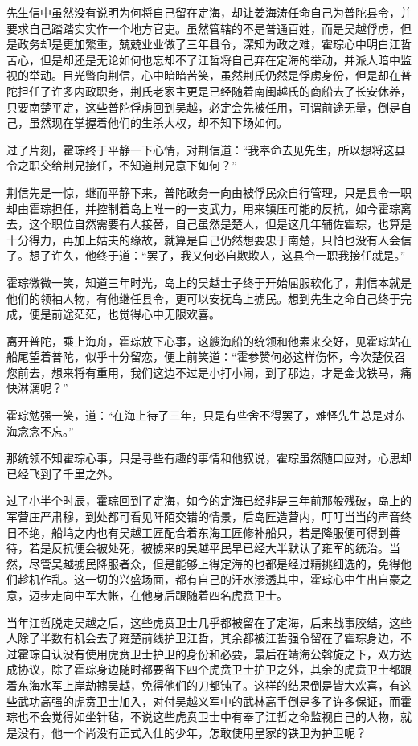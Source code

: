 先生信中虽然没有说明为何将自己留在定海，却让姜海涛任命自己为普陀县令，并要求自己踏踏实实作一个地方官吏。虽然管辖的不是普通百姓，而是吴越俘虏，但是政务却是更加繁重，兢兢业业做了三年县令，深知为政之难，霍琮心中明白江哲苦心，但是却还是无论如何也忘却不了江哲将自己弃在定海的举动，并派人暗中监视的举动。目光瞥向荆信，心中暗暗苦笑，虽然荆氏仍然是俘虏身份，但是却在普陀担任了许多内政职务，荆氏老家主更是已经随着南闽越氏的商船去了长安休养，只要南楚平定，这些普陀俘虏回到吴越，必定会先被任用，可谓前途无量，倒是自己，虽然现在掌握着他们的生杀大权，却不知下场如何。

过了片刻，霍琮终于平静一下心情，对荆信道：“我奉命去见先生，所以想将这县令之职交给荆兄接任，不知道荆兄意下如何？”

荆信先是一惊，继而平静下来，普陀政务一向由被俘民众自行管理，只是县令一职却由霍琮担任，并控制着岛上唯一的一支武力，用来镇压可能的反抗，如今霍琮离去，这个职位自然需要有人接替，自己虽然是楚人，但是这几年辅佐霍琮，也算是十分得力，再加上姑夫的缘故，就算是自己仍然想要忠于南楚，只怕也没有人会信了。想了许久，他终于道：“罢了，我又何必自欺欺人，这县令一职我接任就是。”

霍琮微微一笑，知道三年时光，岛上的吴越士子终于开始屈服软化了，荆信本就是他们的领袖人物，有他继任县令，更可以安抚岛上掳民。想到先生之命自己终于完成，便是前途茫茫，也觉得心中无限欢喜。

离开普陀，乘上海舟，霍琮放下心事，这艘海船的统领和他素来交好，见霍琮站在船尾望着普陀，似乎十分留恋，便上前笑道：“霍参赞何必这样伤怀，今次楚侯召您前去，想来将有重用，我们这边不过是小打小闹，到了那边，才是金戈铁马，痛快淋漓呢？”

霍琮勉强一笑，道：“在海上待了三年，只是有些舍不得罢了，难怪先生总是对东海念念不忘。”

那统领不知霍琮心事，只是寻些有趣的事情和他叙说，霍琮虽然随口应对，心思却已经飞到了千里之外。

过了小半个时辰，霍琮回到了定海，如今的定海已经非是三年前那般残破，岛上的军营庄严肃穆，到处都可看见阡陌交错的情景，后岛匠造营内，叮叮当当的声音终日不绝，船坞之内也有吴越工匠配合着东海工匠修补船只，若是降服便可得到善待，若是反抗便会被处死，被掳来的吴越平民早已经大半默认了雍军的统治。当然，尽管吴越掳民降服者众，但是能够上得定海的也都是经过精挑细选的，免得他们趁机作乱。这一切的兴盛场面，都有自己的汗水渗透其中，霍琮心中生出自豪之意，迈步走向中军大帐，在他身后跟随着四名虎贲卫士。

当年江哲脱走吴越之后，这些虎贲卫士几乎都被留在了定海，后来战事胶结，这些人除了半数有机会去了雍楚前线护卫江哲，其余都被江哲强令留在了霍琮身边，不过霍琮自认没有使用虎贲卫士护卫的身份和必要，最后在靖海公斡旋之下，双方达成协议，除了霍琮身边随时都要留下四个虎贲卫士护卫之外，其余的虎贲卫士都跟着东海水军上岸劫掳吴越，免得他们的刀都钝了。这样的结果倒是皆大欢喜，有这些武功高强的虎贲卫士加入，对付吴越义军中的武林高手倒是多了许多保证，而霍琮也不会觉得如坐针毡，不说这些虎贲卫士中有奉了江哲之命监视自己的人物，就是没有，他一个尚没有正式入仕的少年，怎敢使用皇家的铁卫为护卫呢？

